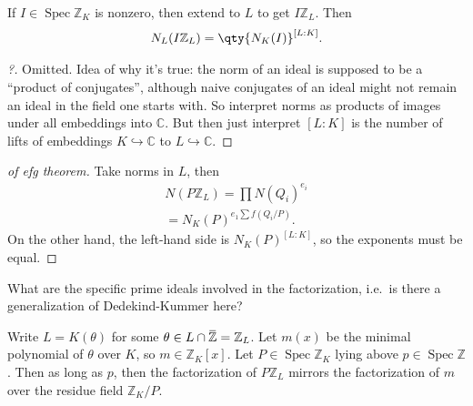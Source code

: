 \begin{lemma}[?]

If \(I\in \operatorname{Spec}{\mathbb{Z}}_K\) is nonzero, then extend to
\(L\) to get \(I{\mathbb{Z}}_L\). Then
\begin{align*}
N_L (I{\mathbb{Z}}_L) = \qty{ N_K(I)}^{[L : K]}
.\end{align*}

\end{lemma}

\begin{proof}[?]

Omitted. Idea of why it's true: the norm of an ideal is supposed to be a
``product of conjugates'', although naive conjugates of an ideal might
not remain an ideal in the field one starts with. So interpret norms as
products of images under all embeddings into \({\mathbb{C}}\). But then
just interpret \([L: K]\) is the number of lifts of embeddings
\(K\hookrightarrow{\mathbb{C}}\) to \(L\hookrightarrow{\mathbb{C}}\).

\end{proof}

\begin{proof}[of efg theorem]

Take norms in \(L\), then
\begin{align*}
N( P{\mathbb{Z}}_L) 
= \prod N(Q_i)^{e_i} \\
= N_K(P)^{e_1 \sum f(Q_i/P)}
.\end{align*}
On the other hand, the left-hand side is \(N_K(P)^{[L: K]}\), so the
exponents must be equal.

\end{proof}

\begin{remark}

What are the specific prime ideals involved in the factorization,
i.e.~is there a generalization of Dedekind-Kummer here?

\end{remark}

\begin{proposition}

Write \(L = K(\theta)\) for some
\(\theta \in L \cap\mkern 1.5mu\overline{\mkern-1.5mu{\mathbb{Z}}\mkern-1.5mu}\mkern 1.5mu= {\mathbb{Z}}_L\).
Let \(m(x)\) be the minimal polynomial of \(\theta\) over \(K\), so
\(m\in {\mathbb{Z}}_K[x]\). Let
\(P\in \operatorname{Spec}{\mathbb{Z}}_K\) lying above
\(p\in \operatorname{Spec}{\mathbb{Z}}\). Then as long as
\(p%
\), then the factorization of \(P{\mathbb{Z}}_L\) mirrors the
factorization of \(m\) over the residue field \({\mathbb{Z}}_K/P\).

\end{proposition}

